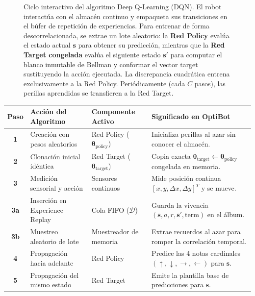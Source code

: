 \begin{figure}[!htb]
\begin{tikzpicture}
\end{tikzpicture}
\caption{Ciclo interactivo del algoritmo Deep Q-Learning (DQN). El robot interactúa con el almacén continuo y empaqueta sus transiciones en el búfer de repetición de experiencias. Para entrenar de forma descorrelacionada, se extrae un lote aleatorio: la \textbf{Red Policy} evalúa el estado actual $\mathbf{s}$ para obtener su predicción, mientras que la \textbf{Red Target congelada} evalúa el siguiente estado $\mathbf{s}'$ para computar el blanco inmutable de Bellman y conformar el vector target sustituyendo la acción ejecutada. La discrepancia cuadrática entrena exclusivamente a la Red Policy. Periódicamente (cada $C$ pasos), las perillas aprendidas se transfieren a la Red Target.}
\label{fig:dqn_flow}
\end{figure}

\begin{table}[!htb]
\centering
\small
\begin{tabular}{c >{\raggedright\arraybackslash}p{4.0cm} >{\raggedright\arraybackslash}p{3.2cm} >{\raggedright\arraybackslash}p{5.2cm}}
  \toprule
  \textbf{Paso} & \textbf{Acción del Algoritmo} & \textbf{Componente Activo} & \textbf{Significado en OptiBot} \\
  \midrule
  \textbf{1} & Creación con pesos aleatorios & Red Policy ($\boldsymbol{\theta}_{\text{policy}}$) & Inicializa perillas al azar sin conocer el almacén. \\
  \addlinespace
  \textbf{2} & Clonación inicial idéntica & Red Target ($\boldsymbol{\theta}_{\text{target}}$) & Copia exacta $\boldsymbol{\theta}_{\text{target}} \leftarrow \boldsymbol{\theta}_{\text{policy}}$ congelada en memoria. \\
  \addlinespace
  \textbf{3} & Medición sensorial y acción & Sensores continuos & Mide posición continua $[x, y, \Delta x, \Delta y]^T$ y se mueve. \\
  \addlinespace
  \textbf{3a} & Inserción en Experience Replay & Cola FIFO ($\mathcal{D}$) & Guarda la vivencia $(\mathbf{s}, a, r, \mathbf{s}', \text{term})$ en el álbum. \\
  \addlinespace
  \textbf{3b} & Muestreo aleatorio de lote & Muestreador de memoria & Extrae recuerdos al azar para romper la correlación temporal. \\
  \addlinespace
  \textbf{4} & Propagación hacia adelante & Red Policy & Predice las 4 notas cardinales $(\uparrow, \downarrow, \rightarrow, \leftarrow)$ para $\mathbf{s}$. \\
  \addlinespace
  \textbf{5} & Propagación del mismo estado & Red Target & Emite la plantilla base de predicciones para $\mathbf{s}$. \\

\end{tabular}
\end{table}
